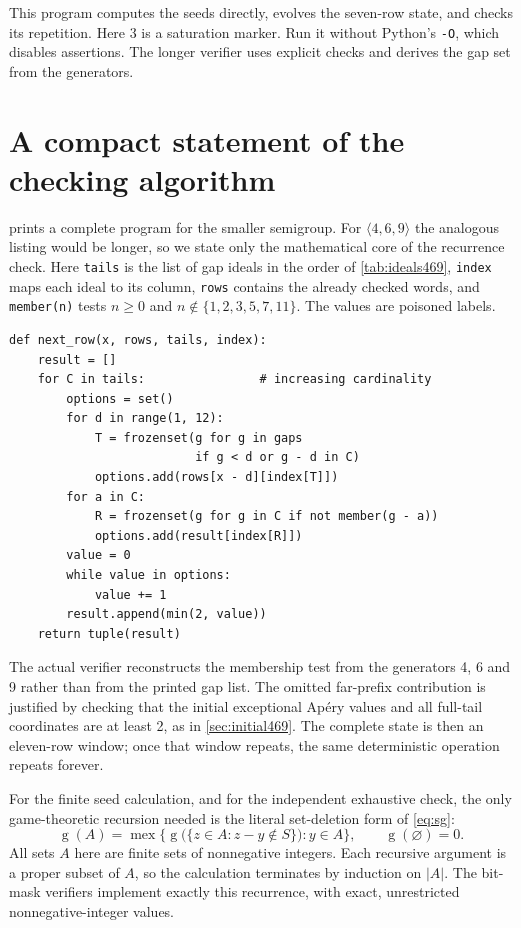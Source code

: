 \documentclass[11pt,letterpaper]{article}
\numberwithin{equation}{section}
\theoremstyle{definition}
\theoremstyle{remark}
\newcommand{\sg}{\operatorname{g}}
\newcommand{\mex}{\operatorname{mex}}
\begin{document}
This program computes the seeds directly, evolves the seven-row state,
and checks its repetition. Here 3 is a saturation marker. Run it
without Python's \texttt{-O}, which disables assertions. The longer
verifier uses explicit checks and derives the gap set from the generators.



\clearpage
\section{A compact statement of the checking algorithm}
\label{app:algorithm}

 prints a complete program for the smaller semigroup. For
$\langle4,6,9\rangle$ the analogous listing would be longer, so we state
only the mathematical core of the recurrence check. Here \texttt{tails}
is the list of gap ideals in the order of \cref{tab:ideals469},
\texttt{index} maps each ideal to its column, \texttt{rows} contains the
already checked words, and \texttt{member(n)} tests $n\geq0$ and
$n\notin\{1,2,3,5,7,11\}$. The values are poisoned labels.

\begin{lstlisting}
def next_row(x, rows, tails, index):
    result = []
    for C in tails:                # increasing cardinality
        options = set()
        for d in range(1, 12):
            T = frozenset(g for g in gaps
                          if g < d or g - d in C)
            options.add(rows[x - d][index[T]])
        for a in C:
            R = frozenset(g for g in C if not member(g - a))
            options.add(result[index[R]])
        value = 0
        while value in options:
            value += 1
        result.append(min(2, value))
    return tuple(result)
\end{lstlisting}

The actual verifier reconstructs the membership test from the generators
4, 6 and 9 rather than from the printed gap list. The omitted far-prefix
contribution is justified by checking that the initial exceptional
Ap\'ery values and all full-tail coordinates are at least 2, as in
\cref{sec:initial469}. The complete state is then an eleven-row window;
once that window repeats, the same deterministic operation repeats
forever.

For the finite seed calculation, and for the independent exhaustive
check, the only game-theoretic recursion needed is the literal
set-deletion form of \cref{eq:sg}:
\begin{equation}\label{eq:literal-mex}
 \sg(A)=\mex\bigl\{\sg\bigl(\{z\in A:z-y\notin S\}\bigr):y\in A\bigr\},
 \qquad \sg(\varnothing)=0.
\end{equation}
All sets $A$ here are finite sets of nonnegative integers. Each recursive
argument is a proper subset of $A$, so the calculation terminates by
induction on $|A|$. The bit-mask verifiers implement exactly this
recurrence, with exact, unrestricted nonnegative-integer values.
\end{document}
